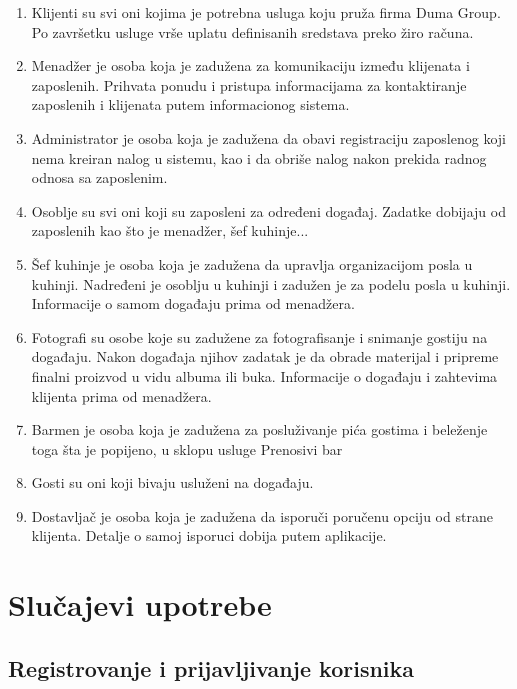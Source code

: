 \documentclass[a4paper]{article}
\begin{document}
    \begin{enumerate}
        \item Klijenti su svi oni kojima je potrebna usluga koju pruža firma Duma Group. Po završetku usluge vrše uplatu definisanih sredstava preko žiro računa.
        \item Menadžer je osoba koja je zadužena za komunikaciju između klijenata i zaposlenih. Prihvata ponudu i pristupa informacijama za kontaktiranje zaposlenih i klijenata putem informacionog sistema.
        \item Administrator je osoba koja je zadužena da obavi registraciju zaposlenog koji nema kreiran nalog u sistemu, kao i da obriše nalog nakon prekida radnog odnosa sa zaposlenim.
        \item Osoblje su svi oni koji su zaposleni za određeni događaj. Zadatke dobijaju od zaposlenih kao što je menadžer, šef kuhinje...
        \item Šef kuhinje je osoba koja je zadužena da upravlja organizacijom posla u kuhinji. Nadređeni je osoblju u kuhinji i zadužen je za podelu posla u kuhinji. Informacije o samom događaju prima od menadžera.
        \item Fotografi su osobe koje su zadužene za fotografisanje i snimanje gostiju na događaju. Nakon događaja njihov zadatak je da obrade materijal i pripreme finalni proizvod u vidu albuma ili buka. Informacije o događaju i zahtevima klijenta prima od menadžera.
        \item Barmen je osoba koja je zadužena za posluživanje pića gostima i beleženje toga šta je popijeno, u sklopu usluge Prenosivi bar
        \item Gosti su oni koji bivaju usluženi na događaju.
        \item Dostavljač je osoba koja je zadužena da isporuči poručenu opciju od strane klijenta. Detalje o samoj isporuci dobija putem aplikacije.
    \end{enumerate}
    
    
\section{Slučajevi upotrebe}


\subsection{Registrovanje i prijavljivanje korisnika}
\end{document}
